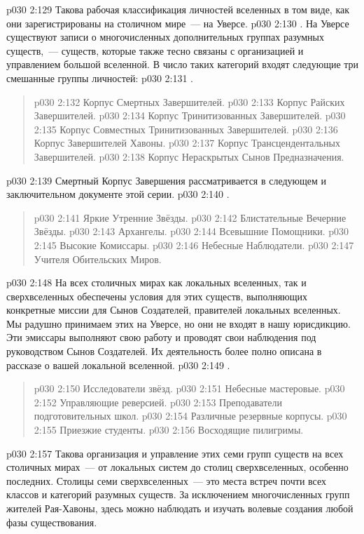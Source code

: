 \vs p030 2:129 \pc Такова рабочая классификация личностей вселенных в том виде, как они зарегистрированы на столичном мире~--- на Уверсе.
\vs p030 2:130 \pc {}. На Уверсе существуют записи о многочисленных дополнительных группах разумных существ,~--- существ, которые также тесно связаны с организацией и управлением большой вселенной. В число таких категорий входят следующие три смешанные группы личностей:
\vs p030 2:131 .
\begin{quote}
\vs p030 2:132 Корпус Смертных Завершителей.
\vs p030 2:133 Корпус Райских Завершителей.
\vs p030 2:134 Корпус Тринитизованных Завершителей.
\vs p030 2:135 Корпус Совместных Тринитизованных Завершителей.
\vs p030 2:136 Корпус Завершителей Хавоны.
\vs p030 2:137 Корпус Трансцендентальных Завершителей.
\vs p030 2:138 Корпус Нераскрытых Сынов Предназначения.
\end{quote}
\vs p030 2:139 \pc Смертный Корпус Завершения рассматривается в следующем и заключительном документе этой серии.
\vs p030 2:140 .
\begin{quote}
\vs p030 2:141 Яркие Утренние Звёзды.
\vs p030 2:142 Блистательные Вечерние Звёзды.
\vs p030 2:143 Архангелы.
\vs p030 2:144 Всевышние Помощники.
\vs p030 2:145 Высокие Комиссары.
\vs p030 2:146 Небесные Наблюдатели.
\vs p030 2:147 Учителя Обительских Миров.
\end{quote}
\vs p030 2:148 \pc На всех столичных мирах как локальных вселенных, так и сверхвселенных обеспечены условия для этих существ, выполняющих конкретные миссии для Сынов Создателей, правителей локальных вселенных. Мы радушно принимаем этих  на Уверсе, но они не входят в нашу юрисдикцию. Эти эмиссары выполняют свою работу и проводят свои наблюдения под руководством Сынов Создателей. Их деятельность более полно описана в рассказе о вашей локальной вселенной.
\vs p030 2:149 .
\begin{quote}
\vs p030 2:150 Исследователи звёзд.
\vs p030 2:151 Небесные мастеровые.
\vs p030 2:152 Управляющие реверсией.
\vs p030 2:153 Преподаватели подготовительных школ.
\vs p030 2:154 Различные резервные корпусы.
\vs p030 2:155 Приезжие студенты.
\vs p030 2:156 Восходящие пилигримы.
\end{quote}
\vs p030 2:157 \pc Такова организация и управление этих семи групп существ на всех столичных мирах~--- от локальных систем до столиц сверхвселенных, особенно последних. Столицы семи сверхвселенных~--- это места встреч почти всех классов и категорий разумных существ. За исключением многочисленных групп жителей Рая\hyp{}Хавоны, здесь можно наблюдать и изучать волевые создания любой фазы существования.
